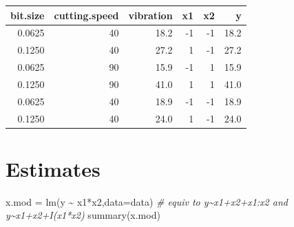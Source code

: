 \documentclass[
]{article}
\newenvironment{Shaded}{\begin{snugshade}}{\end{snugshade}}
\newcommand{\AttributeTok}[1]{\textcolor[rgb]{0.77,0.63,0.00}{#1}}
\newcommand{\CommentTok}[1]{\textcolor[rgb]{0.56,0.35,0.01}{\textit{#1}}}
\newcommand{\ControlFlowTok}[1]{\textcolor[rgb]{0.13,0.29,0.53}{\textbf{#1}}}
\newcommand{\DecValTok}[1]{\textcolor[rgb]{0.00,0.00,0.81}{#1}}
\newcommand{\FunctionTok}[1]{\textcolor[rgb]{0.00,0.00,0.00}{#1}}
\newcommand{\NormalTok}[1]{#1}
\newcommand{\OtherTok}[1]{\textcolor[rgb]{0.56,0.35,0.01}{#1}}
\newcommand{\SpecialCharTok}[1]{\textcolor[rgb]{0.00,0.00,0.00}{#1}}
\newcommand{\StringTok}[1]{\textcolor[rgb]{0.31,0.60,0.02}{#1}}
\begin{document}
\begin{Shaded}
\end{Shaded}

\begin{longtable}[]{@{}rrrrrr@{}}
\toprule
bit.size & cutting.speed & vibration & x1 & x2 & y \\
\midrule
\endhead
0.0625 & 40 & 18.2 & -1 & -1 & 18.2 \\
0.1250 & 40 & 27.2 & 1 & -1 & 27.2 \\
0.0625 & 90 & 15.9 & -1 & 1 & 15.9 \\
0.1250 & 90 & 41.0 & 1 & 1 & 41.0 \\
0.0625 & 40 & 18.9 & -1 & -1 & 18.9 \\
0.1250 & 40 & 24.0 & 1 & -1 & 24.0 \\
\bottomrule
\end{longtable}

\hypertarget{estimates}{%
\section{Estimates}\label{estimates}}

\begin{Shaded}
\begin{Highlighting}[]
\NormalTok{x.mod }\OtherTok{=} \FunctionTok{lm}\NormalTok{(y }\SpecialCharTok{\textasciitilde{}}\NormalTok{ x1}\SpecialCharTok{*}\NormalTok{x2,}\AttributeTok{data=}\NormalTok{data) }\CommentTok{\# equiv to y\textasciitilde{}x1+x2+x1:x2 and y\textasciitilde{}x1+x2+I(x1*x2)}
\FunctionTok{summary}\NormalTok{(x.mod)}
\end{Highlighting}
\end{Shaded}
\end{document}
